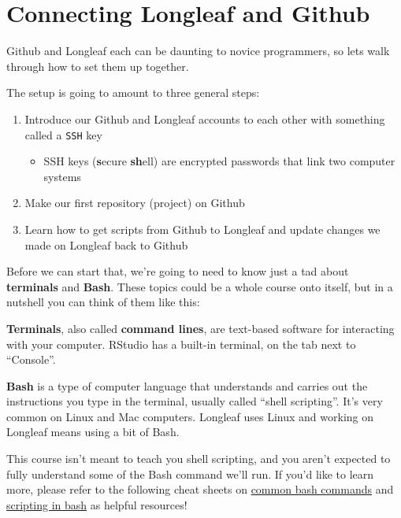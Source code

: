 \documentclass[
  letterpaper,
  DIV=11,
  numbers=noendperiod]{scrreprt}
\providecommand{\tightlist}{%
  \setlength{\itemsep}{0pt}\setlength{\parskip}{0pt}}\usepackage{longtable,booktabs,array}
\begin{document}
\section{Connecting Longleaf and
Github}\label{connecting-longleaf-and-github}

Github and Longleaf each can be daunting to novice programmers, so lets
walk through how to set them up together.

The setup is going to amount to three general steps:

\begin{enumerate}
\def\labelenumi{\arabic{enumi}.}
\tightlist
\item
  Introduce our Github and Longleaf accounts to each other with
  something called a \texttt{SSH} key

  \begin{itemize}
  \tightlist
  \item
    SSH keys (\textbf{s}ecure \textbf{sh}ell) are encrypted passwords
    that link two computer systems
  \end{itemize}
\item
  Make our first repository (project) on Github
\item
  Learn how to get scripts from Github to Longleaf and update changes we
  made on Longleaf back to Github
\end{enumerate}

Before we can start that, we're going to need to know just a tad about
\textbf{terminals} and \textbf{Bash}. These topics could be a whole
course onto itself, but in a nutshell you can think of them like this:

\textbf{Terminals}, also called \textbf{command lines}, are text-based
software for interacting with your computer. RStudio has a built-in
terminal, on the tab next to ``Console''.

\textbf{Bash} is a type of computer language that understands and
carries out the instructions you type in the terminal, usually called
``shell scripting''. It's very common on Linux and Mac computers.
Longleaf uses Linux and working on Longleaf means using a bit of Bash.

\begin{tcolorbox}[enhanced jigsaw, bottomtitle=1mm, bottomrule=.15mm, toprule=.15mm, opacityback=0, leftrule=.75mm, breakable, colback=white, toptitle=1mm, left=2mm, coltitle=black, titlerule=0mm, opacitybacktitle=0.6, title=\textcolor{quarto-callout-tip-color}{\faLightbulb}\hspace{0.5em}{Tip}, rightrule=.15mm, arc=.35mm, colframe=quarto-callout-tip-color-frame, colbacktitle=quarto-callout-tip-color!10!white]

This course isn't meant to teach you shell scripting, and you aren't
expected to fully understand some of the Bash command we'll run. If
you'd like to learn more, please refer to the following cheat sheets on
\href{https://github.com/RehanSaeed/Bash-Cheat-Sheet}{common bash
commands} and \href{https://devhints.io/bash}{scripting in bash} as
helpful resources!

\end{tcolorbox}
\end{document}
